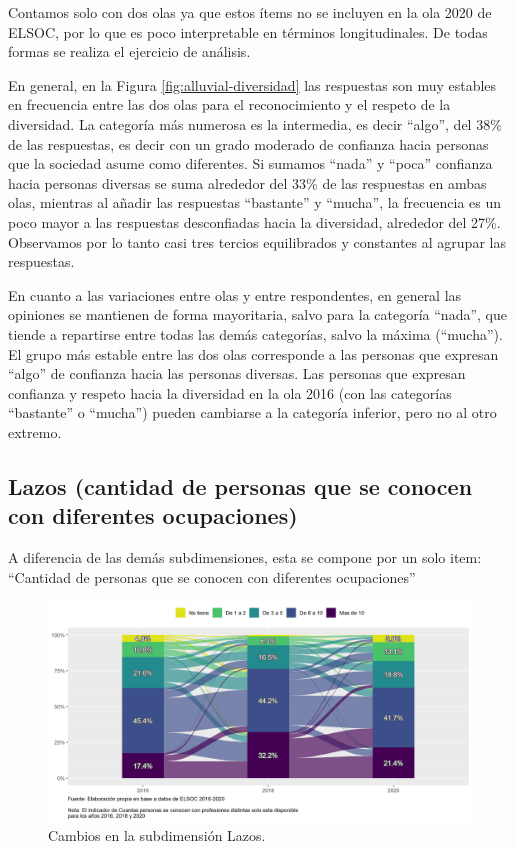 \documentclass[
  12pt,
]{book}
\begin{document}
Contamos solo con dos olas ya que estos ítems no se incluyen en la ola 2020 de ELSOC, por lo que es poco interpretable en términos longitudinales. De todas formas se realiza el ejercicio de análisis.

En general, en la Figura \ref{fig:alluvial-diversidad} las respuestas son muy estables en frecuencia entre las dos olas para el reconocimiento y el respeto de la diversidad. La categoría más numerosa es la intermedia, es decir ``algo'', del 38\% de las respuestas, es decir con un grado moderado de confianza hacia personas que la sociedad asume como diferentes. Si sumamos ``nada'' y ``poca'' confianza hacia personas diversas se suma alrededor del 33\% de las respuestas en ambas olas, mientras al añadir las respuestas ``bastante'' y ``mucha'', la frecuencia es un poco mayor a las respuestas desconfiadas hacia la diversidad, alrededor del 27\%. Observamos por lo tanto casi tres tercios equilibrados y constantes al agrupar las respuestas.

En cuanto a las variaciones entre olas y entre respondentes, en general las opiniones se mantienen de forma mayoritaria, salvo para la categoría ``nada'', que tiende a repartirse entre todas las demás categorías, salvo la máxima (``mucha''). El grupo más estable entre las dos olas corresponde a las personas que expresan ``algo'' de confianza hacia las personas diversas. Las personas que expresan confianza y respeto hacia la diversidad en la ola 2016 (con las categorías ``bastante'' o ``mucha'') pueden cambiarse a la categoría inferior, pero no al otro extremo.

\hypertarget{lazos-cantidad-de-personas-que-se-conocen-con-diferentes-ocupaciones}{%
\subsection{Lazos (cantidad de personas que se conocen con diferentes ocupaciones)}\label{lazos-cantidad-de-personas-que-se-conocen-con-diferentes-ocupaciones}}

A diferencia de las demás subdimensiones, esta se compone por un solo item: ``Cantidad de personas que se conocen con diferentes ocupaciones''

\begin{figure}[H]

{\centering \includegraphics[width=1\linewidth,height=1\textheight]{output/graphs/alluvial_lazos} 

}

\caption{Cambios en la subdimensión Lazos.}\label{fig:alluvial-lazos}
\end{figure}
\end{document}
